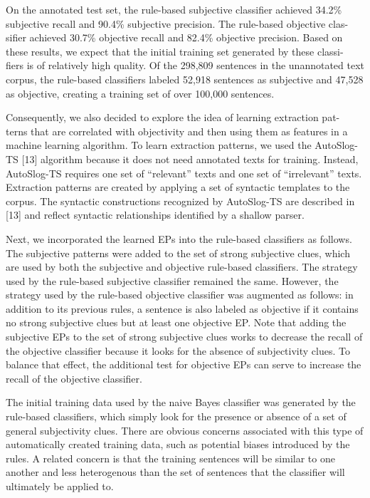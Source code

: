 On the annotated test set, the rule-based subjective classifier
achieved 34.2\% subjective recall and 90.4\% subjective precision. The
rule-based objective clas- sifier achieved 30.7\% objective recall and
82.4\% objective precision. Based on these results, we expect that the
initial training set generated by these classi- fiers is of relatively
high quality. Of the 298,809 sentences in the unannotated text corpus,
the rule-based classifiers labeled 52,918 sentences as subjective and
47,528 as objective, creating a training set of over 100,000
sentences.

Consequently, we also decided to explore the idea of learning
extraction pat- terns that are correlated with objectivity and then
using them as features in a machine learning algorithm. To learn
extraction patterns, we used the AutoSlog- TS [13] algorithm because
it does not need annotated texts for training. Instead, AutoSlog-TS
requires one set of ``relevant'' texts and one set of ``irrelevant''
texts.  Extraction patterns are created by applying a set of syntactic
templates to the corpus. The syntactic constructions recognized by
AutoSlog-TS are described in [13] and reflect syntactic relationships
identified by a shallow parser.

Next, we incorporated the learned EPs into the rule-based classifiers
as follows. The subjective patterns were added to the set of strong
subjective clues, which are used by both the subjective and objective
rule-based classifiers. The strategy used by the rule-based subjective
classifier remained the same. However, the strategy used by the
rule-based objective classifier was augmented as follows: in addition
to its previous rules, a sentence is also labeled as objective if it
contains no strong subjective clues but at least one objective
EP. Note that adding the subjective EPs to the set of strong
subjective clues works to decrease the recall of the objective
classifier because it looks for the absence of subjectivity
clues. To balance that effect, the additional test for objective EPs
can serve to increase the recall of the objective classifier.

The initial training data used by the naive Bayes classifier was
generated by the rule-based classifiers, which simply look for the
presence or absence of a set of general subjectivity clues. There are
obvious concerns associated with this type of automatically created
training data, such as potential biases introduced by the rules. A
related concern is that the training sentences will be similar to one
another and less heterogenous than the set of sentences that the
classifier will ultimately be applied to.

